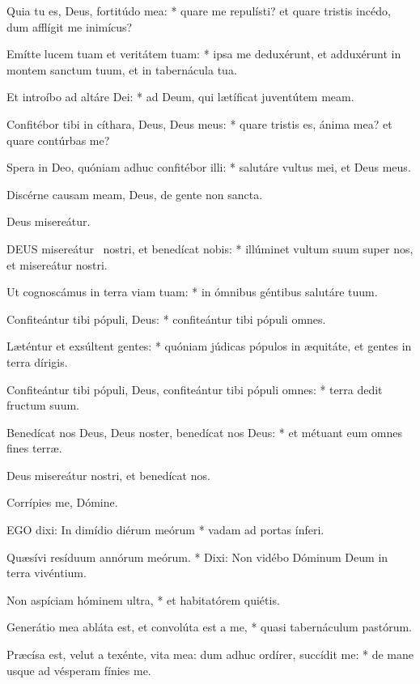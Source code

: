 Quia tu es, Deus, fortitúdo mea: * quare me repulísti? et quare tristis incédo, dum afflígit me inimícus?

Emítte lucem tuam et veritátem tuam: * ipsa me deduxérunt, et adduxérunt in montem sanctum tuum, et in tabernácula tua.

Et introíbo ad altáre Dei: * ad Deum, qui lætíficat juventútem meam.

Confitébor tibi in cíthara, Deus, Deus meus: * quare tristis es, ánima mea? et quare contúrbas me?

Spera in Deo, quóniam adhuc confitébor illi: * salutáre vultus mei, et Deus meus.

 Discérne causam meam, Deus, de gente non sancta.

 Deus misereátur. \textdagger


\lettrine[lines=2]{D}{EUS} misereátur \textdagger\ nostri, et benedícat nobis: * illúminet vultum suum super nos, et misereátur nostri.

Ut cognoscámus in terra viam tuam: * in ómnibus géntibus salutáre tuum.

Confiteántur tibi pópuli, Deus: * confiteántur tibi pópuli omnes.

Læténtur et exsúltent gentes: * quóniam júdicas pópulos in æquitáte, et gentes in terra dírigis.

Confiteántur tibi pópuli, Deus, confiteántur tibi pópuli omnes: * terra dedit fructum suum.

Benedícat nos Deus, Deus noster, benedícat nos Deus: * et métuant eum omnes fines terræ.

 Deus misereátur nostri, et benedícat nos.

 Corrípies me, Dómine.


\lettrine[lines=2]{E}{GO} dixi: In dimídio diérum meórum * vadam ad portas ínferi.

Quæsívi resíduum annórum meórum. * Dixi: Non vidébo Dóminum Deum in terra vivéntium.

Non aspíciam hóminem ultra, * et habitatórem quiétis.

Generátio mea abláta est, et convolúta est a me, * quasi tabernáculum pastórum.

Præcísa est, velut a texénte, vita mea: dum adhuc ordírer, succídit me: * de mane usque ad vésperam fínies me.

